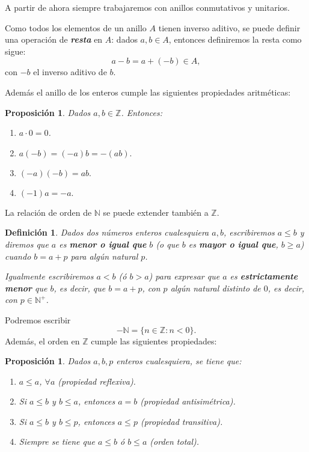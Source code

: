 \documentclass[12pt]{article}
\newtheorem{proposition}[theorem]{Proposición}
\newtheorem{definition}[theorem]{Definición}
\begin{document}
A partir de ahora siempre trabajaremos con anillos conmutativos y unitarios.

Como todos los elementos de un anillo $A$ tienen inverso aditivo, se puede definir una operación de \textbf{\textit{resta}} en $A$: dados $a,b \in A$, entonces definiremos la resta como sigue: $$a-b = a+ (-b) \in A,$$ con $-b$ el inverso aditivo de $b$.

Además el anillo de los enteros cumple las siguientes propiedades aritméticas: 

\begin{proposition}Dados $a, b \in \mathbb{Z}$. Entonces: 
\begin{enumerate}
\item $a \cdot 0 = 0$.
\item $a(-b)= (-a)b= -(ab).$
\item $(-a)(-b)=ab.$
\item $(-1)a = -a.$
\end{enumerate}
\end{proposition}

La relación de orden de $\mathbb{N}$ se puede extender también a $\mathbb{Z}$.

\begin{definition}Dados dos números enteros cualesquiera $a,b$, escribiremos $a \leq b$ y diremos que $a$ es \textbf{menor o igual que} $b$ (o que $b$ es \textbf{mayor o igual que}, $b \geq a$) cuando $b = a+p$ para algún natural $p$.

Igualmente escribiremos $a< b$ (ó $b> a$) para expresar que $a$ es \textbf{estrictamente menor} que $b$, es decir, que $b = a +p$, con $p$ algún natural distinto de $0$, es decir, con $p \in \mathbb{N}^+$.
\end{definition} 

Podremos escribir $$- \mathbb{N} = \lbrace n \in \mathbb{Z}: n < 0 \rbrace.$$
Además, el orden en $\mathbb{Z}$ cumple las siguientes propiedades: 

\begin{proposition}Dados $a,b,p$ enteros cualesquiera, se tiene que:
\begin{enumerate}
\item $a \leq a$, $\forall a$ (propiedad reflexiva).
\item Si $a \leq b$ y $b \leq a$, entonces $a = b$ (propiedad antisimétrica).
\item Si $a \leq b$ y $b \leq p$, entonces $a \leq p$ (propiedad transitiva).
\item Siempre se tiene que $a \leq b$ ó $b \leq a$ (orden total).
\end{enumerate}
\end{proposition}
\end{document}
